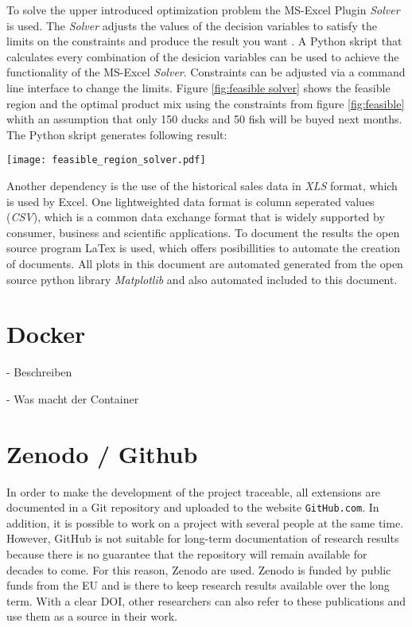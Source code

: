 \documentclass{article}
\begin{document}
\begin{multicols}{2}
To solve the upper introduced optimization problem the MS-Excel Plugin \textit{Solver} is used. The \textit{Solver} adjusts the values of the decision variables to satisfy the limits on the constraints and produce the result you want \cite{microsoft}. A Python skript that calculates every combination of the desicion variables can be used to achieve the functionality of the MS-Excel \textit{Solver}. Constraints can be adjusted via a command line interface to change the limits. Figure \ref{fig:feasible solver} shows the feasible region and the optimal product mix using the constraints from figure \ref{fig:feasible} whith an assumption that only 150 ducks and 50 fish will be buyed next months. The Python skript generates following result:

\begin{center}
\texttt{[image: feasible\_region\_solver.pdf]}
\label{fig:feasible solver}
\end{center}

Another dependency is the use of the historical sales data in \textit{XLS} format, which is used by Excel. One lightweighted data format is column seperated values (\textit{CSV}), which is a common data exchange format that is widely supported by consumer, business and scientific applications. To document the results the open source program LaTex is used, which offers posibillities to automate the creation of documents. All plots in this document are automated generated from the open source python library \textit{Matplotlib} and also automated included to this document.

\section{Docker}
- Beschreiben

- Was macht der Container

\section{Zenodo / Github}
In order to make the development of the project traceable, all extensions are documented in a Git repository and uploaded to the website \texttt{GitHub.com}. In addition, it is possible to work on a project with several people at the same time. However, GitHub is not suitable for long-term documentation of research results because there is no guarantee that the repository will remain available for decades to come. For this reason, Zenodo are used.
Zenodo is funded by public funds from the EU and is there to keep research results available over the long term. With a clear DOI, other researchers can also refer to these publications and use them as a source in their work.



\end{multicols}
\end{document}
